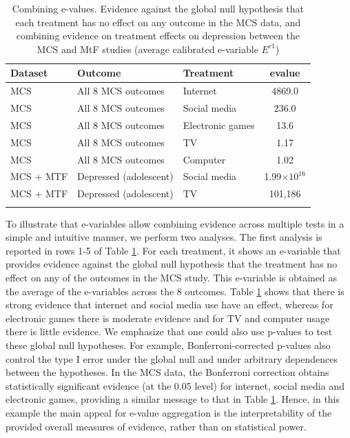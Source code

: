 \documentclass[pdflatex,sn-mathphys-num]{sn-jnl}%
\theoremstyle{thmstyleone}%
\theoremstyle{thmstyletwo}%
\theoremstyle{thmstylethree}%
\begin{document}
\begin{table}[ht]
\caption{\color{blue} Combining e-values. Evidence against the global null hypothesis that each treatment has no effect on any outcome in the MCS data, and combining evidence on treatment effects on depression between the MCS and MtF studies (average calibrated e-variable $E^{c1}$) \color{black}}
\label{tab:mcs_overalltest}%
\begin{tabular}{@{}lllc@{}}
\toprule
Dataset & Outcome &  Treatment    &     evalue \\
\midrule
MCS  & All 8 MCS outcomes & Internet  &  4869.0  \\ 
MCS  & All 8 MCS outcomes & Social media    &   236.0  \\ 
MCS  & All 8 MCS outcomes & Electronic games&    13.6  \\ 
MCS  & All 8 MCS outcomes & TV              &     1.17 \\ 
MCS  & All 8 MCS outcomes & Computer    &     1.02 \\ 
MCS + MTF & Depressed (adolescent) & Social media & 1.99$\times 10^{16}$  \\ 
MCS + MTF & Depressed (adolescent) & TV &         101,186        \\ 
\botrule
\end{tabular}
\end{table}


To illustrate that e-variables allow combining evidence across multiple tests in a simple and intuitive manner, we perform two analyses.
The first analysis is reported in rows 1-5 of Table \ref{tab:mcs_overalltest}. For each treatment, it shows an e-variable that provides evidence against the global null hypothesis that the treatment has no effect on any of the outcomes in the MCS study. This e-variable is obtained as the average of the e-variables across the 8 outcomes. Table \ref{tab:mcs_overalltest} shows that there is strong evidence that internet and social media use have an effect, whereas for electronic games there is moderate evidence and for TV and computer usage there is little evidence.
We emphasize that one could also use p-values to test these global null hypotheses. For example, Bonferroni-corrected p-values also control the type I error under the global null and under arbitrary dependences between the hypotheses. In the MCS data, the Bonferroni correction obtains statistically significant evidence (at the 0.05 level) for internet, social media and electronic games, providing a similar message to that in Table \ref{tab:mcs_overalltest}. 
Hence, in this example the main appeal for e-value aggregation is the interpretability of the provided overall measures of evidence, rather than on statistical power.
\end{document}
